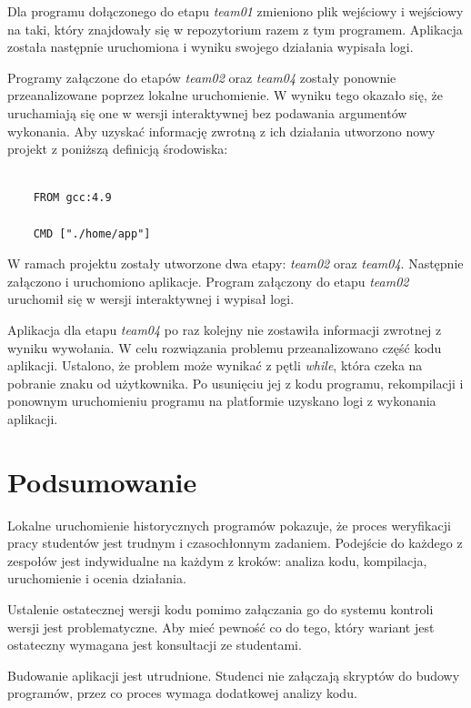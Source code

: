 Dla programu dołączonego do etapu \textit{team01} zmieniono plik wejściowy i wejściowy na taki, który znajdowały się w repozytorium razem z tym programem.
Aplikacja została następnie uruchomiona i wyniku swojego działania wypisała logi.

Programy załączone do etapów \textit{team02} oraz \textit{team04} zostały ponownie przeanalizowane poprzez lokalne uruchomienie.
W wyniku tego okazało się, że uruchamiają się one w wersji interaktywnej bez podawania argumentów wykonania.
Aby uzyskać informację zwrotną z ich działania utworzono nowy projekt z poniższą definicją środowiska:

{\selectfont
\tiny
\begin{lstlisting}

    FROM gcc:4.9

    CMD ["./home/app"]

\end{lstlisting}
}

W ramach projektu zostały utworzone dwa etapy:  \textit{team02} oraz \textit{team04}.
Następnie załączono i uruchomiono aplikacje.
Program załączony do etapu \textit{team02} uruchomił się w wersji interaktywnej i wypisał logi.

Aplikacja dla etapu \textit{team04} po raz kolejny nie zostawiła informacji zwrotnej z wyniku wywołania.
W celu rozwiązania problemu przeanalizowano część kodu aplikacji.
Ustalono, że problem może wynikać z pętli \textit{while}, która czeka na pobranie znaku od użytkownika.
Po usunięciu jej z kodu programu, rekompilacji i ponownym uruchomieniu programu na platformie uzyskano logi z wykonania aplikacji.


\section{Podsumowanie}
\label{verification_summary}

Lokalne uruchomienie historycznych programów pokazuje, że proces weryfikacji pracy studentów jest trudnym i czasochłonnym zadaniem.
Podejście do każdego z zespołów jest indywidualne na każdym z kroków: analiza kodu, kompilacja, uruchomienie i ocenia działania.

Ustalenie ostatecznej wersji kodu pomimo załączania go do systemu kontroli wersji jest problematyczne.
Aby mieć pewność co do tego, który wariant jest ostateczny wymagana jest konsultacji ze studentami.

Budowanie aplikacji jest utrudnione.
Studenci nie załączają skryptów do budowy programów, przez co proces wymaga dodatkowej analizy kodu.

